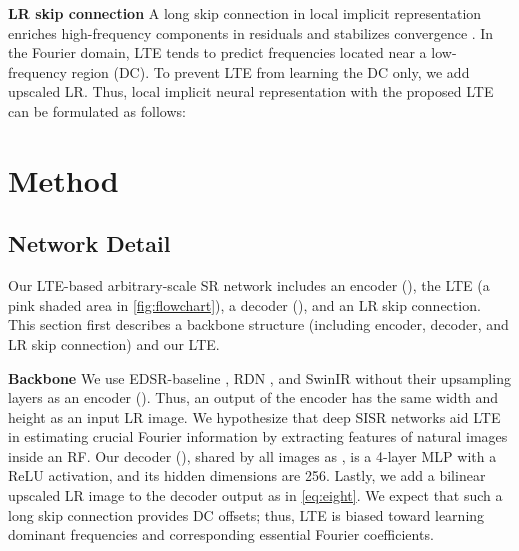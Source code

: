 \documentclass[10pt,twocolumn,letterpaper]{article}
\begin{document}
{\bf LR skip connection} A long skip connection in local implicit representation enriches high-frequency components in residuals and stabilizes convergence \cite{Kim_2016_CVPR}. In the Fourier domain, LTE tends to predict frequencies located near a low-frequency region (DC). To prevent LTE from learning the DC only, we add upscaled LR. Thus, local implicit neural representation with the proposed LTE can be formulated as follows:
 

























































\section{Method}
\subsection{Network Detail}
Our LTE-based arbitrary-scale SR network includes an encoder (), the LTE (a pink shaded area in \cref{fig:flowchart}), a decoder (), and an LR skip connection. This section first describes a backbone structure (including encoder, decoder, and LR skip connection) and our LTE.

\textbf{Backbone} We use EDSR-baseline \cite{Lim_2017_CVPR_Workshops}, RDN \cite{zhang2018residual}, and SwinIR \cite{liang2021swinir} without their upsampling layers as an encoder (). Thus, an output of the encoder has the same width and height as an input LR image. We hypothesize that deep SISR networks \cite{Lim_2017_CVPR_Workshops, zhang2018residual, liang2021swinir} aid LTE in estimating crucial Fourier information by extracting features of natural images inside an RF. Our decoder (), shared by all images as \cite{chen2021learning}, is a 4-layer MLP with a ReLU activation, and its hidden dimensions are 256. Lastly, we add a bilinear upscaled LR image to the decoder output as in \cref{eq:eight}. We expect that such a long skip connection provides DC offsets; thus, LTE is biased toward learning dominant frequencies and corresponding essential Fourier coefficients.
\end{document}
